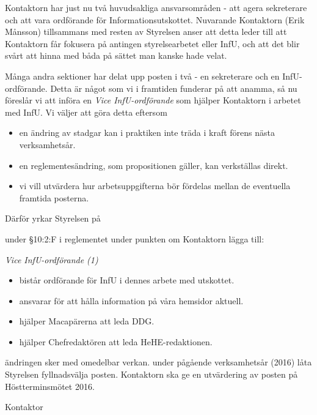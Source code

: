 \documentclass[../_main/handlingar.tex]{subfiles}
\begin{document}

Kontaktorn har just nu två huvudsakliga ansvarsområden - att agera sekreterare och att vara ordförande för Informationsutskottet. Nuvarande Kontaktorn (Erik Månsson) tillsammans med resten av Styrelsen anser att detta leder till att Kontaktorn får fokusera på antingen styrelsearbetet eller InfU, och att det blir svårt att hinna med båda på sättet man kanske hade velat.

Många andra sektioner har delat upp posten i två - en sekreterare och en InfU-ordförande. Detta är något som vi i framtiden funderar på att anamma, så nu föreslår vi att införa en \emph{Vice InfU-ordförande} som hjälper Kontaktorn i arbetet med InfU. Vi väljer att göra detta eftersom
\begin{itemize}[label={--}, topsep=0cm, noitemsep]
    \item en ändring av stadgar kan i praktiken inte träda i kraft förens nästa verksamhetsår.
    \item en reglementesändring, som propositionen gäller, kan verkställas direkt.
    \item vi vill utvärdera hur arbetsuppgifterna bör fördelas mellan de eventuella framtida posterna.
\end{itemize}

Därför yrkar Styrelsen på
\begin{attsatser}
    \att under \S10:2:F i reglementet under punkten om Kontaktorn lägga till:\par
    {\it
    Vice InfU-ordförande (1)
    \begin{itemize}[label={--}, topsep=0cm, noitemsep]
        \item bistår ordförande för InfU i dennes arbete med utskottet.
        \item ansvarar för att hålla information på våra hemsidor aktuell.
        \item hjälper Macapärerna att leda DDG.
        \item hjälper Chefredaktören att leda HeHE-redaktionen.
    \end{itemize}
    }
    \att ändringen sker med omedelbar verkan.
    \att under pågående verksamhetsår (2016) låta Styrelsen fyllnadsvälja posten.
    \att Kontaktorn ska ge en utvärdering av posten på Höstterminsmötet 2016.
\end{attsatser}

\begin{signatures}{1}
    \ist
    \signature{Erik Månsson}{Kontaktor}
\end{signatures}
\end{document}
